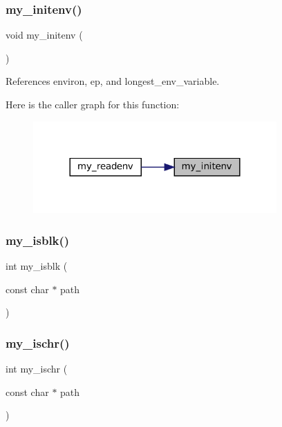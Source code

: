 \subsubsection{\texorpdfstring{my\+\_\+initenv()}{my\_initenv()}}
{\footnotesize\ttfamily void my\+\_\+initenv (\begin{DoxyParamCaption}{ }\end{DoxyParamCaption})}



References environ, ep, and longest\+\_\+env\+\_\+variable.

Here is the caller graph for this function\+:\nopagebreak
\begin{figure}[H]
\begin{center}
\leavevmode
\includegraphics[width=264pt]{C-M__system_8c_ab5188f2ca99719a14c77a1acae06f93a_icgraph}
\end{center}
\end{figure}
\mbox{\label{C-M__system_8c_ad07b549d969a0670b0b8f7c6bef83e92}} 
\subsubsection{\texorpdfstring{my\+\_\+isblk()}{my\_isblk()}}
{\footnotesize\ttfamily int my\+\_\+isblk (\begin{DoxyParamCaption}\item[{const char $\ast$}]{path }\end{DoxyParamCaption})}

\mbox{\label{C-M__system_8c_ae59ec13b3517e84ddd30a0cd5352a01d}} 
\subsubsection{\texorpdfstring{my\+\_\+ischr()}{my\_ischr()}}
{\footnotesize\ttfamily int my\+\_\+ischr (\begin{DoxyParamCaption}\item[{const char $\ast$}]{path }\end{DoxyParamCaption})}

